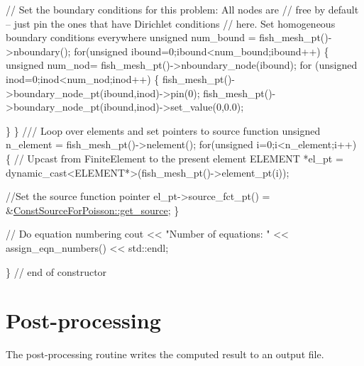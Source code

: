 \begin{DoxyCodeInclude}
 \textcolor{comment}{// Set the boundary conditions for this problem: All nodes are}
 \textcolor{comment}{// free by default -- just pin the ones that have Dirichlet conditions}
 \textcolor{comment}{// here.  Set homogeneous boundary conditions everywhere}
 \textcolor{keywordtype}{unsigned} num\_bound = fish\_mesh\_pt()->nboundary();
 \textcolor{keywordflow}{for}(\textcolor{keywordtype}{unsigned} ibound=0;ibound<num\_bound;ibound++)
  \{
   \textcolor{keywordtype}{unsigned} num\_nod= fish\_mesh\_pt()->nboundary\_node(ibound);
   \textcolor{keywordflow}{for} (\textcolor{keywordtype}{unsigned} inod=0;inod<num\_nod;inod++)
    \{
     fish\_mesh\_pt()->boundary\_node\_pt(ibound,inod)->pin(0); 
     fish\_mesh\_pt()->boundary\_node\_pt(ibound,inod)->set\_value(0,0.0);

    \}
  \}
 \textcolor{comment}{}
\textcolor{comment}{ /// Loop over elements and set pointers to source function}
\textcolor{comment}{} \textcolor{keywordtype}{unsigned} n\_element = fish\_mesh\_pt()->nelement();
 \textcolor{keywordflow}{for}(\textcolor{keywordtype}{unsigned} i=0;i<n\_element;i++)
  \{
   \textcolor{comment}{// Upcast from FiniteElement to the present element}
   ELEMENT *el\_pt = \textcolor{keyword}{dynamic\_cast<}ELEMENT*\textcolor{keyword}{>}(fish\_mesh\_pt()->element\_pt(i));
   
   \textcolor{comment}{//Set the source function pointer}
   el\_pt->source\_fct\_pt() = &\hyperlink{namespaceConstSourceForPoisson_a40ef79083874b58ed42b4df2ca0f4c10}{ConstSourceForPoisson::get\_source};
  \}

 \textcolor{comment}{// Do equation numbering}
 cout << \textcolor{stringliteral}{"Number of equations: "} << assign\_eqn\_numbers() << std::endl; 

\} \textcolor{comment}{// end of constructor}

\end{DoxyCodeInclude}




 

\hypertarget{index_doc}{}\section{Post-\/processing}\label{index_doc}
The post-\/processing routine writes the computed result to an output file.



